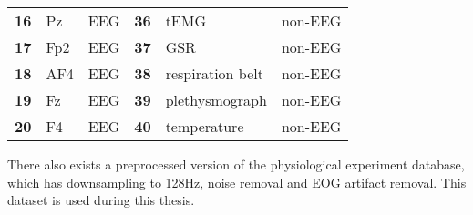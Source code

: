 \begin{table}[]
\begin{tabular}{lll|lll}
\textbf{16}      & Pz            & EEG               & \textbf{36}      & tEMG             & non-EEG           \\
\textbf{17}      & Fp2           & EEG               & \textbf{37}      & GSR              & non-EEG           \\
\textbf{18}      & AF4           & EEG               & \textbf{38}      & respiration belt & non-EEG           \\
\textbf{19}      & Fz            & EEG               & \textbf{39}      & plethysmograph   & non-EEG           \\
\textbf{20}      & F4            & EEG               & \textbf{40}      & temperature      & non-EEG          
\end{tabular}
\end{table}


\npar

There also exists a preprocessed version of the physiological experiment database, which has downsampling to 128Hz, noise removal and EOG artifact removal. This dataset is used during this thesis.

